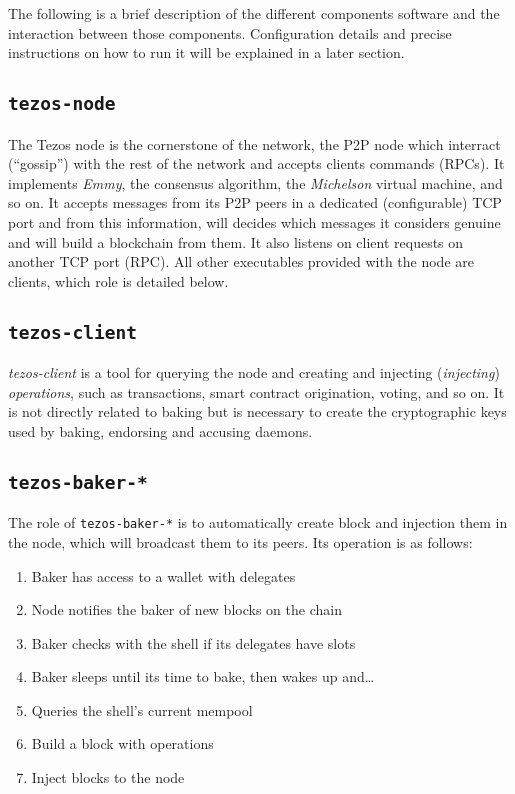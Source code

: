 \documentclass[a4paper,twocolumn,10pt]{article}
\begin{document}
The following is a brief description of the different components
software and the interaction between those components. Configuration
details and precise instructions on how to run it will be explained in
a later section.

\subsection{\texttt{tezos-node}}

The Tezos node is the cornerstone of the network, the P2P node which
interract (“gossip”) with the rest of the network and accepts clients
commands (RPCs). It implements \emph{Emmy}, the consensus algorithm,
the \emph{Michelson} virtual machine, and so on. It accepts messages
from its P2P peers in a dedicated (configurable) TCP port and from
this information, will decides which messages it considers genuine and
will build a blockchain from them. It also listens on client requests
on another TCP port (RPC). All other executables provided with the
node are clients, which role is detailed below.

\subsection{\texttt{tezos-client}}

\emph{tezos-client} is a tool for querying the node and creating and
injecting (\emph{injecting}) \emph{operations}, such as transactions,
smart contract origination, voting, and so on. It is not directly
related to baking but is necessary to create the cryptographic keys
used by baking, endorsing and accusing daemons.

\subsection{\texttt{tezos-baker-*}}

The role of \texttt{tezos-baker-*} is to automatically create block
and injection them in the node, which will broadcast them to its
peers. Its operation is as follows:

\begin{footnotesize}
\begin{enumerate}
\item Baker has access to a wallet with delegates
\item Node notifies the baker of new blocks on the chain
\item Baker checks with the shell if its delegates have slots
\item Baker sleeps until its time to bake, then wakes up and…
\item Queries the shell’s current mempool
\item Build a block with operations
\item Inject blocks to the node
\end{enumerate}
\end{footnotesize}
\end{document}
